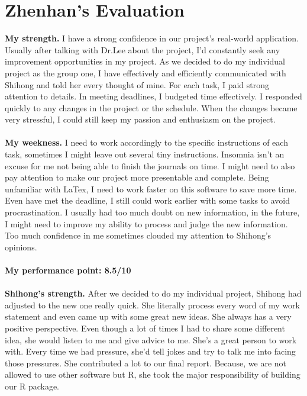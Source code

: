 \documentclass[12pt,letterpaper]{article}
\theoremstyle{definition}
\begin{document}
\section{Zhenhan's Evaluation} 
 {\bf My strength.} I have a strong confidence in our project's real-world application. Usually after talking with Dr.Lee about the project, I'd constantly seek any improvement opportunities in my project. As we decided to do my individual project as the group one, I have effectively and efficiently communicated with Shihong and told her every thought of mine. For each task, I paid strong attention to details. In meeting deadlines, I budgeted time effectively. I responded quickly to any changes in the project or the schedule. When the changes became very stressful, I could still keep my passion and enthusiasm on the project. \\
\vspace{1 mm}
\noindent  \\
 {\bf My weekness.} I need to work accordingly to the specific instructions of each task, sometimes I might leave out several tiny instructions. Insomnia isn't an excuse for me not being able to finish the journals on time. I might need to also pay attention to make our project more presentable and complete. Being unfamiliar with LaTex, I need to work faster on this software to save more time. Even have met the deadline, I still could work earlier with some tasks to avoid procrastination. I usually had too much doubt on new information, in the future, I might need to improve my ability to process and judge the new information. Too much confidence in me sometimes clouded my attention to Shihong's opinions.\\
\vspace{1 mm}
\noindent  \\
{\bf My performance point: 8.5/10}\\
\vspace{5 mm}
\noindent  \\
 {\bf Shihong's strength.} After we decided to do my individual project, Shihong had adjusted to the new one really quick. She literally process every word of my work statement and even came up with some great new ideas. She always has a very positive perspective. Even though a lot of times I had to share some different idea, she would listen to me and give advice to me. She's a great person to work with. Every time we had pressure, she'd tell jokes and try to talk me into facing those pressures. She contributed a lot to our final report. Because, we are not allowed to use other software but R, she took the major responsibility of building our R package. \\
\end{document}
